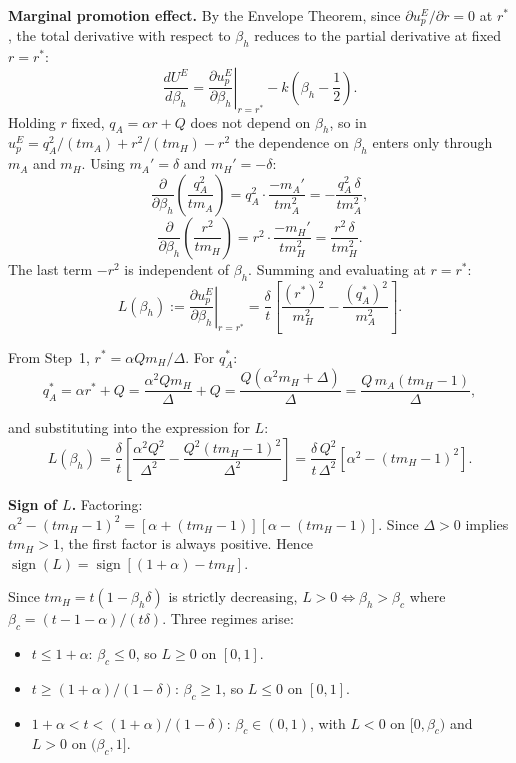 \documentclass[mnsc,nonblindrev]{informs3_NoOR}
\begin{document}
\medskip\noindent\textbf{Marginal promotion effect.}
By the Envelope Theorem, since $\partial u_p^E/\partial r = 0$ at $r^*$, the total derivative with respect to $\beta_h$ reduces to the partial derivative at fixed $r = r^*$:
\[
\frac{dU^E}{d\beta_h} = \left.\frac{\partial u_p^E}{\partial\beta_h}\right|_{r=r^*} - k\!\left(\beta_h-\frac{1}{2}\right).
\]
Holding $r$ fixed, $q_A = \alpha r + Q$ does not depend on $\beta_h$, so in $u_p^E = q_A^2/(tm_A) + r^2/(tm_H) - r^2$ the dependence on $\beta_h$ enters only through $m_A$ and $m_H$. Using $m_A' = \delta$ and $m_H' = -\delta$:
\[
\frac{\partial}{\partial\beta_h}\!\left(\frac{q_A^2}{tm_A}\right) = q_A^2\cdot\frac{-m_A'}{tm_A^2} = -\frac{q_A^2\,\delta}{tm_A^2},
\]
\[
\frac{\partial}{\partial\beta_h}\!\left(\frac{r^2}{tm_H}\right) = r^2\cdot\frac{-m_H'}{tm_H^2} = \frac{r^2\,\delta}{tm_H^2}.
\]
The last term $-r^2$ is independent of $\beta_h$. Summing and evaluating at $r = r^*$:
\[
L(\beta_h) := \left.\frac{\partial u_p^E}{\partial\beta_h}\right|_{r=r^*} = \frac{\delta}{t}\!\left[\frac{(r^*)^2}{m_H^2} - \frac{(q_A^*)^2}{m_A^2}\right].
\]


From Step~1, $r^* = \alpha Qm_H/\Delta$. For $q_A^*$:
\[
q_A^* = \alpha r^* + Q = \frac{\alpha^2 Qm_H}{\Delta} + Q = \frac{Q(\alpha^2 m_H + \Delta)}{\Delta} = \frac{Q\,m_A(tm_H-1)}{\Delta},
\]

and substituting into the expression for $L$:
\[
L(\beta_h) = \frac{\delta}{t}\!\left[\frac{\alpha^2 Q^2}{\Delta^2} - \frac{Q^2(tm_H-1)^2}{\Delta^2}\right] = \frac{\delta\,Q^2}{t\,\Delta^2}\!\left[\alpha^2 - (tm_H-1)^2\right].
\]
 
\medskip\noindent\textbf{Sign of $L$.}
Factoring: $\alpha^2 - (tm_H-1)^2 = [\alpha + (tm_H-1)][\alpha - (tm_H-1)]$. Since $\Delta > 0$ implies $tm_H > 1$, the first factor is always positive. Hence $\operatorname{sign}(L) = \operatorname{sign}[(1+\alpha) - tm_H]$.
 
Since $tm_H = t(1-\beta_h\delta)$ is strictly decreasing, $L > 0 \Leftrightarrow \beta_h > \beta_c$ where $\beta_c = (t-1-\alpha)/(t\delta)$. Three regimes arise:
\begin{itemize}
\item $t \leq 1+\alpha$: $\beta_c \leq 0$, so $L \geq 0$ on $[0,1]$.
\item $t \geq (1+\alpha)/(1-\delta)$: $\beta_c \geq 1$, so $L \leq 0$ on $[0,1]$.
\item $1+\alpha < t < (1+\alpha)/(1-\delta)$: $\beta_c \in (0,1)$, with $L < 0$ on $[0,\beta_c)$ and $L > 0$ on $(\beta_c,1]$.
\end{itemize}
 
\end{document}
